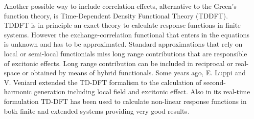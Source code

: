 Another possible way to include correlation effects, alternative to the Green's function theory, is Time-Dependent Density Functional Theory (TDDFT)\cite{PhysRevLett.52.997}. TDDFT is in principle an exact theory to calculate response functions in finite systems. However the exchange-correlation functional that enters in the equations is unknown and has to be approximated. Standard approximations that rely on local or semi-local functionials miss long range contributions that are responsible of excitonic effects\cite{botti2007time}. Long range contribution can be included in reciprocal or real-space or obtained by means of hybrid functionals.\cite{botti2007time,faber2014excited} Some years ago, E. Luppi and V. Veniard extended the TD-DFT formalism to the calculation of second-harmonic generation including local field and excitonic effect.\cite{PhysRevB.82.235201} 
Also in its real-time formulation TD-DFT has been used to calculate non-linear response functions in both finite and extended systems providing very good results.\cite{takimoto:154114,andrade2007time} 
